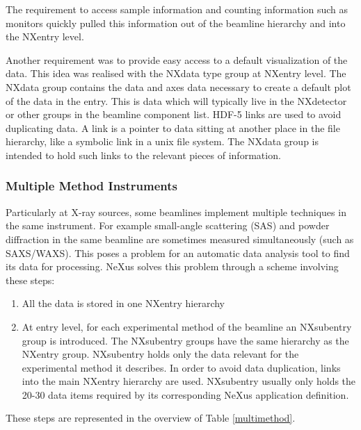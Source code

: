 \documentclass[%
 aip,
rsi,
 amsmath,amssymb,
 reprint,%
]{revtex4-1}
\begin{document}
The requirement to access sample information and counting information such as monitors quickly 
pulled this information out of the beamline hierarchy and into the NXentry level.

Another requirement was to provide easy access to a default visualization of the data. This idea was realised with the 
NXdata type group at NXentry level. The NXdata group contains the data and axes data necessary to create a default plot of 
the data in the entry. This is data which will typically live in the NXdetector or other groups in the 
beamline component list. HDF-5 links are used to avoid duplicating data. A link 
is a pointer to data sitting at another place in the file hierarchy, like a symbolic link in a unix 
file system.  The NXdata group is intended to hold such links to the relevant pieces of information.

\subsubsection{Multiple Method Instruments}

Particularly at X-ray sources, some beamlines implement multiple techniques in the same instrument. 
For example small-angle scattering (SAS) and powder diffraction in the same beamline are sometimes measured 
simultaneously (such as SAXS/WAXS). This poses a problem for an automatic data analysis tool to find its data 
for processing.  NeXus solves this problem through a scheme involving these steps:
\begin{enumerate}
\item All the data is stored in one NXentry hierarchy
\item At entry level, for each experimental method of the beamline an NXsubentry group is introduced. The 
  NXsubentry groups have the same hierarchy as the  NXentry group. NXsubentry holds only the data relevant 
  for the experimental method it describes. In order to avoid data duplication, links into the main NXentry 
  hierarchy are used. 
  NXsubentry usually only holds the 20-30 data items required by its corresponding NeXus 
  application definition.  
\end{enumerate} 
These steps are represented in the overview of Table \ref{multimethod}.
\end{document}
